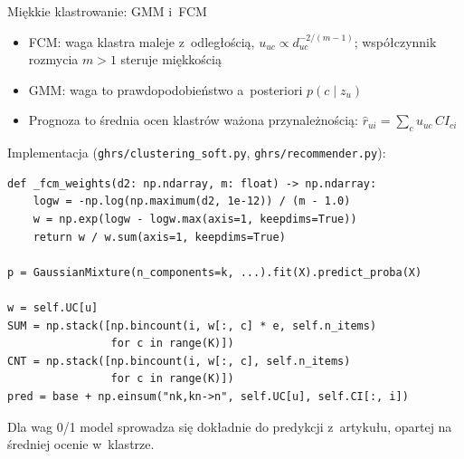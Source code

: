 \documentclass[red]{beamer}
\begin{document}
    \begin{frame}[fragile]{Miękkie klastrowanie: GMM i~FCM}
        \footnotesize
        \begin{itemize}
            \item FCM: waga klastra maleje z~odległością, $u_{uc} \propto d_{uc}^{-2/(m-1)}$;
                  współczynnik rozmycia $m > 1$ steruje miękkością
            \item GMM: waga to prawdopodobieństwo a~posteriori $p(c \mid z_u)$
            \item Prognoza to średnia ocen klastrów ważona przynależnością:
                  $\hat r_{ui} = \sum_{c} u_{uc}\, CI_{ci}$
        \end{itemize}
        Implementacja (\texttt{ghrs/clustering\_soft.py}, \texttt{ghrs/recommender.py}):
\begin{lstlisting}
def _fcm_weights(d2: np.ndarray, m: float) -> np.ndarray:
    logw = -np.log(np.maximum(d2, 1e-12)) / (m - 1.0)
    w = np.exp(logw - logw.max(axis=1, keepdims=True))
    return w / w.sum(axis=1, keepdims=True)

p = GaussianMixture(n_components=k, ...).fit(X).predict_proba(X)

w = self.UC[u]
SUM = np.stack([np.bincount(i, w[:, c] * e, self.n_items)
                for c in range(K)])
CNT = np.stack([np.bincount(i, w[:, c], self.n_items)
                for c in range(K)])
pred = base + np.einsum("nk,kn->n", self.UC[u], self.CI[:, i])
\end{lstlisting}
        Dla wag 0/1 model sprowadza się dokładnie do predykcji z~artykułu, opartej
        na średniej ocenie w~klastrze.
    \end{frame}
\end{document}

